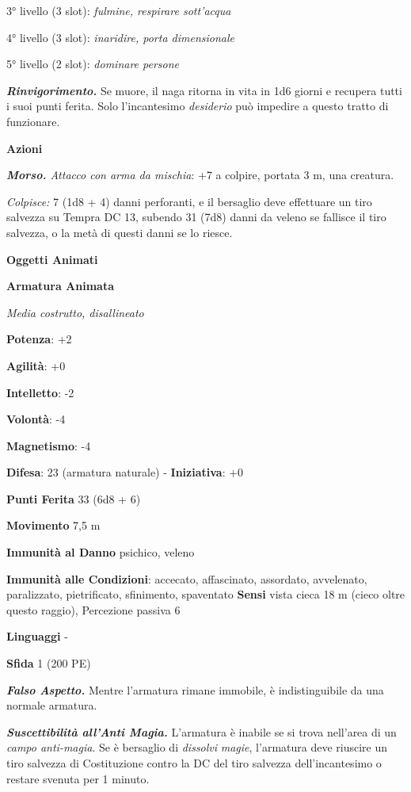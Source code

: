 \begin{multicols}{2}
3° livello (3 slot): \emph{fulmine, respirare sott'acqua}

4° livello (3 slot): \emph{inaridire, porta dimensionale}

5° livello (2 slot): \emph{dominare persone}

\emph{\textbf{Rinvigorimento.}} Se muore, il naga ritorna in vita in 1d6
giorni e recupera tutti i suoi punti ferita. Solo l'incantesimo
\emph{desiderio} può impedire a questo tratto di funzionare.

\smallskip\textbf{Azioni}

\emph{\textbf{Morso.} Attacco con arma da mischia}: +7 a colpire,
portata 3 m, una creatura.

\emph{Colpisce:} 7 (1d8 + 4) danni perforanti, e il bersaglio deve
effettuare un tiro salvezza su Tempra DC 13, subendo 31 (7d8)
danni da veleno se fallisce il tiro salvezza, o la metà di questi danni
se lo riesce.

\textbf{Oggetti Animati}

\textbf{Armatura Animata}

\emph{Media costrutto, disallineato}

\textbf{Potenza}: +2

\textbf{Agilità}: +0

\textbf{Intelletto}: -2

\textbf{Volontà}: -4

\textbf{Magnetismo}: -4

\textbf{Difesa}: 23 (armatura naturale) - \textbf{Iniziativa}: +0

\textbf{Punti Ferita} 33 (6d8 + 6)

\textbf{Movimento} 7,5 m

\textbf{Immunità al Danno} psichico, veleno

\textbf{Immunità alle Condizioni}: accecato, affascinato, assordato,
avvelenato, paralizzato, pietrificato, sfinimento, spaventato
\textbf{Sensi} vista cieca 18 m (cieco oltre questo raggio), Percezione
passiva 6

\textbf{Linguaggi} -

\textbf{Sfida} 1 (200 PE)\smallskip

\emph{\textbf{Falso Aspetto.}} Mentre l'armatura rimane immobile, è
indistinguibile da una normale armatura.

\emph{\textbf{Suscettibilità all'Anti Magia.}} L'armatura è inabile se
si trova nell'area di un \emph{campo anti-magia}. Se è bersaglio di
\emph{dissolvi} \emph{magie}, l'armatura deve riuscire un tiro salvezza
di Costituzione contro la DC del tiro salvezza dell'incantesimo o
restare svenuta per 1 minuto.


\end{multicols}
